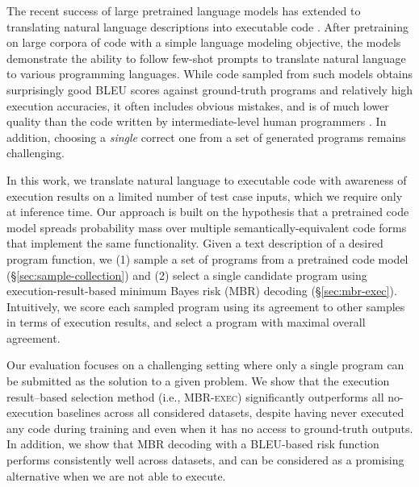 \documentclass[11pt]{article}
\newcommand{\interalia}[1]{\citep[\textit{inter alia}]{#1}}
\newcommand{\mbrexec}{\textsc{MBR-exec}\xspace}
\begin{document}
The recent success of large pretrained language models \citep{radford2019language,brown2020language} has extended to translating natural language descriptions into executable code \interalia{chen2021evaluating,austin2021program,li2022competition}. After pretraining on large corpora of code with a simple language modeling objective,
the models demonstrate the ability to follow few-shot prompts \citep{radford2019language,brown2020language} to translate natural language to various programming languages. While code sampled from such models obtains surprisingly good BLEU scores against ground-truth programs and relatively high execution accuracies, it often includes obvious mistakes, and is of much lower quality than the code written by intermediate-level human programmers \citep{li2022competition}. 
In addition, choosing a \textit{single} correct one from a set of generated programs remains challenging.

In this work, we translate natural language to executable code with awareness of execution results on a limited number of test case inputs, which we require only at inference time. Our approach is built on the hypothesis that a pretrained code model spreads probability mass over multiple semantically-equivalent code forms that implement the same functionality. Given a text description of a desired program function, we (1) sample a set of programs from a pretrained code model (\S\ref{sec:sample-collection}) and (2) select a single candidate program using execution-result-based minimum Bayes risk (MBR) decoding (\S\ref{sec:mbr-exec}). Intuitively, we score each sampled program using its agreement to other samples in terms of execution results, and select a program with maximal overall agreement. 

Our evaluation focuses on a challenging setting where only a single program can be submitted as the solution to a given problem. We show that the execution result--based selection method (i.e., \mbrexec) significantly outperforms all no-execution baselines across all considered datasets, despite having never executed any code during training and even when it has no access to ground-truth outputs. In addition, we show that MBR decoding with a BLEU-based risk function performs consistently well across datasets, and can be considered as a promising alternative when we are not able to execute. 
\end{document}
